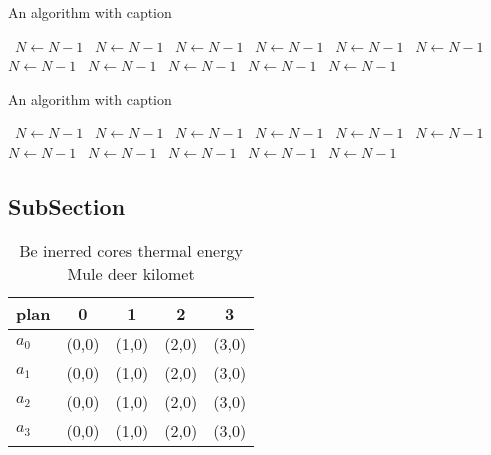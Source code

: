 \documentclass[a4paper]{article}
\begin{document}
\begin{algorithm}
\caption{An algorithm with caption}
\begin{algorithmic}
\    \State $N \gets N - 1$
\    \State $N \gets N - 1$
\    \State $N \gets N - 1$
\    \State $N \gets N - 1$
\    \State $N \gets N - 1$
\    \State $N \gets N - 1$
\    \State $N \gets N - 1$
\    \State $N \gets N - 1$
\    \State $N \gets N - 1$
\    \State $N \gets N - 1$
\    \State $N \gets N - 1$
\EndWhile
\end{algorithmic}
\end{algorithm}

\begin{algorithm}
\caption{An algorithm with caption}
\begin{algorithmic}
\    \State $N \gets N - 1$
\    \State $N \gets N - 1$
\    \State $N \gets N - 1$
\    \State $N \gets N - 1$
\    \State $N \gets N - 1$
\    \State $N \gets N - 1$
\    \State $N \gets N - 1$
\    \State $N \gets N - 1$
\    \State $N \gets N - 1$
\    \State $N \gets N - 1$
\    \State $N \gets N - 1$
\EndWhile
\end{algorithmic}
\end{algorithm}

\subsection{SubSection}

\begin{table}
\begin{adjustbox}{width=0.8\columnwidth}
\begin{tabular}{|l|l|l|l|l|}
\hline
\textbf{plan} & \multicolumn{1}{c|}{\textbf{0}} & \multicolumn{1}{c|}{\textbf{1}} & \multicolumn{1}{c|}{\textbf{2}} & \multicolumn{1}{c|}{\textbf{3}} \\ \hline
\textbf{$a_0$}  & (0,0) & (1,0) & (2,0) & (3,0) \\ \hline
\textbf{$a_1$}  & (0,0) & (1,0) & (2,0) & (3,0) \\ \hline
\textbf{$a_2$}  & (0,0) & (1,0) & (2,0) & (3,0) \\ \hline
\textbf{$a_3$}  & (0,0) & (1,0) & (2,0) & (3,0) \\ \hline
\end{tabular}
\end{adjustbox}
\caption{Be inerred cores thermal energy Mule deer kilomet
}
\end{table}
\end{document}
